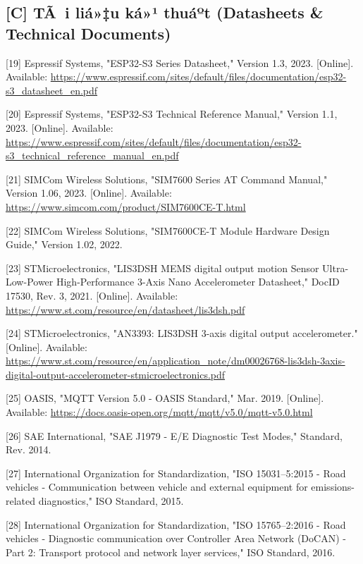 \documentclass[a4paper]{extarticle}
\begin{document}
\subsection{{[}C{]} TÃ i liá»‡u ká»¹ thuáº­t (Datasheets \& Technical
Documents)}\label{c-tuxe0i-liux1ec7u-kux1ef9-thuux1eadt-datasheets--technical-documents}

{[}19{]} Espressif Systems, "ESP32-S3 Series Datasheet," Version 1.3,
2023. {[}Online{]}. Available:
\url{https://www.espressif.com/sites/default/files/documentation/esp32-s3_datasheet_en.pdf}

{[}20{]} Espressif Systems, "ESP32-S3 Technical Reference Manual,"
Version 1.1, 2023. {[}Online{]}. Available:
\url{https://www.espressif.com/sites/default/files/documentation/esp32-s3_technical_reference_manual_en.pdf}

{[}21{]} SIMCom Wireless Solutions, "SIM7600 Series AT Command Manual,"
Version 1.06, 2023. {[}Online{]}. Available:
\url{https://www.simcom.com/product/SIM7600CE-T.html}

{[}22{]} SIMCom Wireless Solutions, "SIM7600CE-T Module Hardware Design
Guide," Version 1.02, 2022.

{[}23{]} STMicroelectronics, "LIS3DSH MEMS digital output motion
Sensor Ultra-Low-Power High-Performance 3-Axis
\textquotesingle Nano\textquotesingle{} Accelerometer Datasheet," DocID
17530, Rev. 3, 2021. {[}Online{]}. Available:
\url{https://www.st.com/resource/en/datasheet/lis3dsh.pdf}

{[}24{]} STMicroelectronics, "AN3393: LIS3DSH 3-axis digital output accelerometer." {[}Online{]}. Available:
\url{https://www.st.com/resource/en/application_note/dm00026768-lis3dsh-3axis-digital-output-accelerometer-stmicroelectronics.pdf}

{[}25{]} OASIS, "MQTT Version 5.0 - OASIS Standard," Mar. 2019.
{[}Online{]}. Available:
\url{https://docs.oasis-open.org/mqtt/mqtt/v5.0/mqtt-v5.0.html}

{[}26{]} SAE International, "SAE J1979 - E/E Diagnostic Test Modes,"
Standard, Rev. 2014.

{[}27{]} International Organization for Standardization, "ISO
15031--5:2015 - Road vehicles - Communication between vehicle and
external equipment for emissions-related diagnostics," ISO Standard,
2015.

{[}28{]} International Organization for Standardization, "ISO
15765--2:2016 - Road vehicles - Diagnostic communication over Controller
Area Network (DoCAN) - Part 2: Transport protocol and network layer
services," ISO Standard, 2016.
\end{document}
